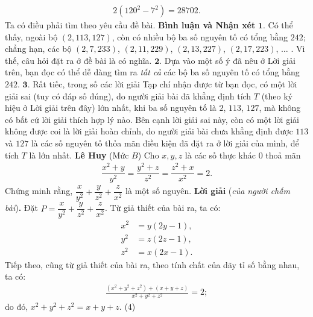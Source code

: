 \begin{multicols}{2}
	\begin{align*}
		2\left( {{{120}^2} - {7^2}} \right) = 28702.
	\end{align*}
	Ta có điều phải tìm theo yêu cầu đề bài.
	\vskip 0.05cm
	\textbf{\color{thachthuctoanhoc}Bình luận và Nhận xét}
	\vskip 0.05cm	
	$\pmb{1.}$ Có thể thấy, ngoài bộ $(2, 113, 127)$, còn có nhiều bộ ba số nguyên tố có tổng bằng $242$; chẳng hạn, các bộ $(2, 7, 233)$, $(2, 11, 229)$, $(2, 13, 227)$, $(2, 17, 223)$, $\ldots$ . Vì thế, câu hỏi đặt ra ở đề bài là có nghĩa.
	\vskip 0.05cm
	$\pmb{2.}$ Dựa vào một số ý đã nêu ở Lời giải trên, bạn đọc có thể dễ dàng tìm ra \textit{tất cả} các bộ ba số nguyên tố có tổng bằng $242$.
	\vskip 0.05cm
	$\pmb{3.}$ Rất tiếc, trong số các lời giải Tạp chí nhận được từ bạn đọc, có một lời giải sai (tuy có đáp số đúng), do người giải bài đã khẳng định tích $T$ (theo ký hiệu ở Lời giải trên đây) lớn nhất, khi ba số nguyên tố là $2$, $113$, $127$, mà không có bất cứ lời giải thích hợp lý nào. Bên cạnh lời giải sai này, còn có một lời giải không được coi là lời giải hoàn chỉnh, do người giải bài chưa khẳng định được $113$ và $127$ là các số nguyên tố thỏa mãn điều kiện đã đặt ra ở lời giải của mình, để tích $T$ là lớn nhất.
	\vskip 0.05cm
	\hfill \textbf{\color{thachthuctoanhoc}Lê Huy}
	\vskip 0.05cm
	{}
	(Mức $B$) Cho $x,y,z$ là các số thực khác $0$ thoả mãn 
	\begin{align*}
		\dfrac{x^2+y}{y^2}=\dfrac{y^2+z}{z^2}=\dfrac{z^2+x}{x^2}=2.
	\end{align*}
	Chứng minh rằng, $\dfrac x{y^2}+\dfrac y{z^2}+\dfrac z{x^2}$ là một số nguyên.
	\vskip 0.05cm
	\textbf{\color{thachthuctoanhoc}Lời giải} (\textit{của người chấm bài})\textbf{\color{thachthuctoanhoc}.}
	\vskip 0.05cm
	Đặt  $P = \dfrac{x}{{{y^2}}} + \dfrac{y}{{{z^2}}} + \dfrac{z}{{{x^2}}}$.
	\vskip 0.05cm
	Từ giả thiết của bài ra, ta có:
	\begin{align*}
		{x^2} &= y\left( {2y - 1} \right), \tag{$1$}\\
		{y^2} &= z\left( {2z - 1} \right),\tag{$2$}\\
		{z^2} &= x\left( {2x - 1} \right).\tag{$3$}
	\end{align*}
	Tiếp theo, cũng từ giả thiết của bài ra, theo tính chất của dãy tỉ số bằng nhau, ta có:
	\begin{align*}
		\frac{{\left( {{x^2} + {y^2} + {z^2}} \right) + \left( {x + y + z} \right)}}{{{x^2} + {y^2} + {z^2}}} = 2;
	\end{align*}
	do đó,  ${x^2} + {y^2} + {z^2} = x + y + z$. \hfill ($4$)

\end{multicols}
